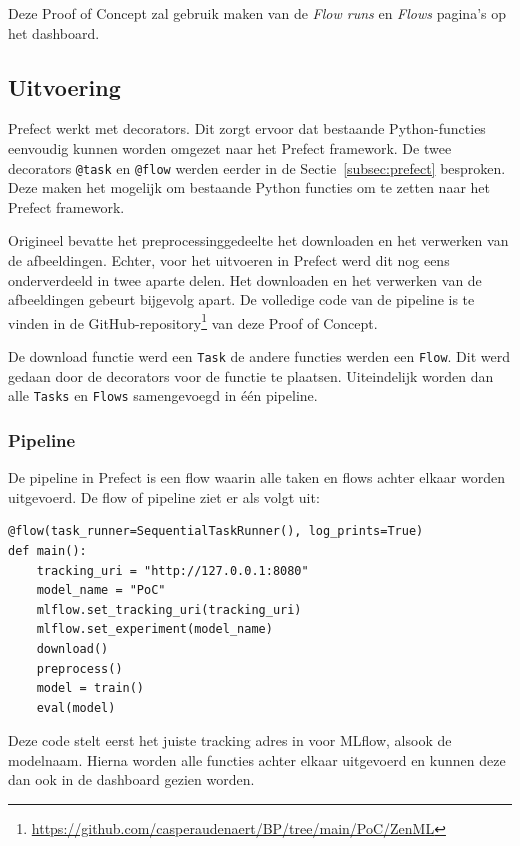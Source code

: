 Deze Proof of Concept zal gebruik maken van de \textit{Flow runs} en \textit{Flows} pagina's op het dashboard.

\subsection{Uitvoering}

Prefect werkt met decorators. Dit zorgt ervoor dat bestaande Python-functies eenvoudig kunnen worden omgezet naar het Prefect framework. De twee decorators \texttt{@task} en \texttt{@flow} werden eerder in de Sectie~\ref{subsec:prefect} besproken. Deze maken het mogelijk om bestaande Python functies om te zetten naar het Prefect framework.

Origineel bevatte het preprocessinggedeelte het downloaden en het verwerken van de afbeeldingen. Echter, voor het uitvoeren in Prefect werd dit nog eens onderverdeeld in twee aparte delen. Het downloaden en het verwerken van de afbeeldingen gebeurt bijgevolg apart. De volledige code van de pipeline is te vinden in de GitHub-repository\footnote{\url{https://github.com/casperaudenaert/BP/tree/main/PoC/ZenML}} van deze Proof of Concept.

De download functie werd een \texttt{Task} de andere functies werden een \texttt{Flow}. Dit werd gedaan door de decorators voor de functie te plaatsen. Uiteindelijk worden dan alle \texttt{Tasks} en \texttt{Flows} samengevoegd in één pipeline.

\subsubsection{Pipeline}

De pipeline in Prefect is een flow waarin alle taken en flows achter elkaar worden uitgevoerd. De flow of pipeline ziet er als volgt uit:

\begin{verbatim}
@flow(task_runner=SequentialTaskRunner(), log_prints=True)
def main():
    tracking_uri = "http://127.0.0.1:8080"
    model_name = "PoC"
    mlflow.set_tracking_uri(tracking_uri)
    mlflow.set_experiment(model_name)
    download()
    preprocess()
    model = train()
    eval(model)
\end{verbatim}

Deze code stelt eerst het juiste tracking adres in voor MLflow, alsook de modelnaam. Hierna worden alle functies achter elkaar uitgevoerd en kunnen deze dan ook in de dashboard gezien worden.

